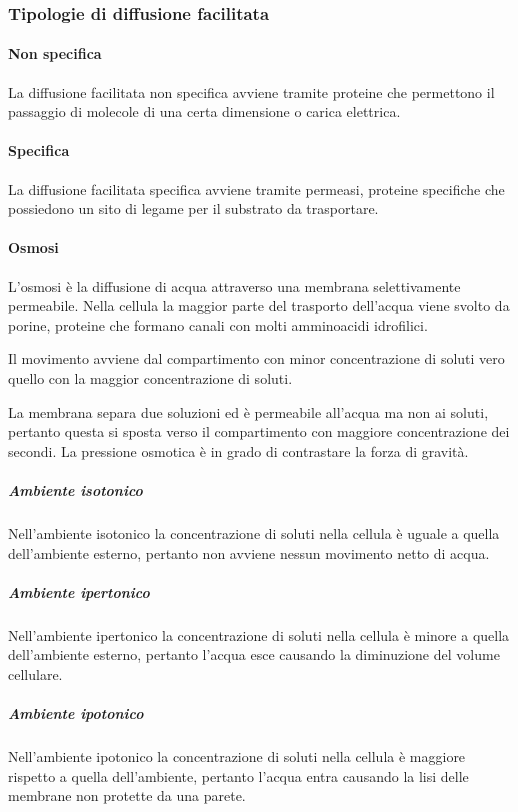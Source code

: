 		\subsubsection{Tipologie di diffusione facilitata}

			\paragraph{Non specifica}
			La diffusione facilitata non specifica avviene tramite proteine che permettono il passaggio di molecole di una certa dimensione o carica elettrica.

			\paragraph{Specifica}
			La diffusione facilitata specifica avviene tramite permeasi, proteine specifiche che possiedono un sito di legame per il substrato da trasportare.

			\paragraph{Osmosi}
			L'osmosi \`e la diffusione di acqua attraverso una membrana selettivamente permeabile.
			Nella cellula la maggior parte del trasporto dell'acqua viene svolto da porine, proteine che formano canali con molti amminoacidi idrofilici.

			Il movimento avviene dal compartimento con minor concentrazione di soluti vero quello con la maggior concentrazione di soluti. 

			La membrana separa due soluzioni ed \`e permeabile all'acqua ma non ai soluti, pertanto questa si sposta verso il compartimento con maggiore concentrazione dei secondi.
			La pressione osmotica \`e in grado di contrastare la forza di gravit\`a.

				\subparagraph{Ambiente isotonico}
				Nell'ambiente isotonico la concentrazione di soluti nella cellula \`e uguale a quella dell'ambiente esterno, pertanto non avviene nessun movimento netto di acqua.

				\subparagraph{Ambiente ipertonico}
				Nell'ambiente ipertonico la concentrazione di soluti nella cellula \`e minore a quella dell'ambiente esterno, pertanto l'acqua esce causando la diminuzione del volume cellulare.

				\subparagraph{Ambiente ipotonico}
				Nell'ambiente ipotonico la concentrazione di soluti nella cellula \`e maggiore rispetto a quella dell'ambiente, pertanto l'acqua entra causando la lisi delle membrane non protette da una parete.

